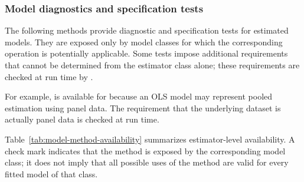 \subsubsection{Model diagnostics and specification tests}\label{sec:model-tests}
The following methods provide diagnostic and specification tests for
estimated models. They are exposed only by model classes for which the
corresponding operation is potentially applicable. Some tests impose
additional requirements that cannot be determined from the estimator
class alone; these requirements are checked at run time by \lgretl.

For example,  is available for
 because an OLS model may represent pooled
estimation using panel data. The requirement that the underlying
dataset is actually panel data is checked at run time.

Table~\ref{tab:model-method-availability} summarizes estimator-level
availability. A check mark indicates that the method is exposed by the
corresponding model class; it does not imply that all possible uses of
the method are valid for every fitted model of that class.

